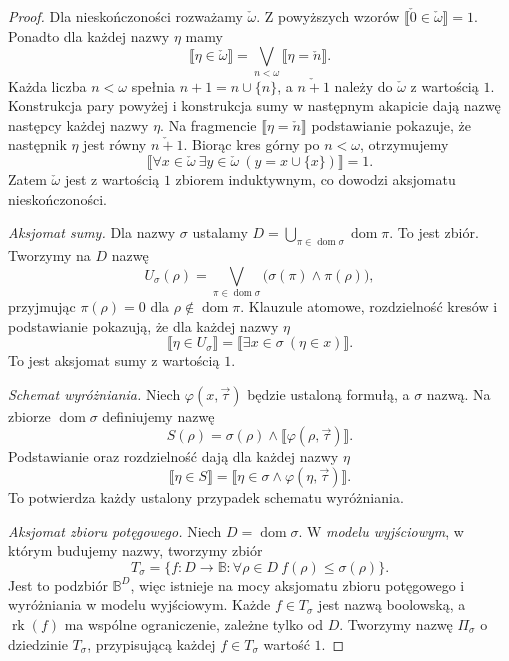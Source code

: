 \begin{proof}
Dla nieskończoności
rozważamy $\check\omega$.
Z powyższych wzorów
$\llbracket\check 0\in
\check\omega\rrbracket=1$.
Ponadto dla każdej nazwy
$\eta$ mamy
\[
 \llbracket\eta\in\check\omega\rrbracket
 =\bigvee_{n<\omega}
     \llbracket\eta=\check n\rrbracket.
\]
Każda liczba $n<\omega$
spełnia $n+1=n\cup\{n\}$,
a $\check{n+1}$ należy
do $\check\omega$ z
wartością $1$. Konstrukcja
pary powyżej i konstrukcja
sumy w następnym akapicie
dają nazwę następcy każdej
nazwy $\eta$. Na fragmencie
$\llbracket\eta=\check n\rrbracket$
podstawianie pokazuje, że
następnik $\eta$ jest równy
$\check{n+1}$. Biorąc kres
górny po $n<\omega$,
otrzymujemy
\[
 \llbracket
  \forall x\in\check\omega\
  \exists y\in\check\omega\
     (y=x\cup\{x\})
 \rrbracket=1.
\]
Zatem $\check\omega$ jest
z wartością $1$ zbiorem
induktywnym, co dowodzi
aksjomatu nieskończoności.

\emph{Aksjomat sumy.}
Dla nazwy $\sigma$ ustalamy
$D=\bigcup_{\pi\in\operatorname{dom}\sigma}
\operatorname{dom}\pi$. To jest zbiór.
Tworzymy na $D$ nazwę
\[
 U_\sigma(\rho)=
 \bigvee_{\pi\in\operatorname{dom}\sigma}
   \bigl(\sigma(\pi)\wedge
     \pi(\rho)\bigr),
\]
przyjmując $\pi(\rho)=0$ dla
$\rho\notin\operatorname{dom}\pi$.
Klauzule atomowe, rozdzielność
kresów i podstawianie pokazują,
że dla każdej nazwy $\eta$
\[
 \llbracket\eta\in U_\sigma\rrbracket
 =\llbracket
    \exists x\in\sigma\ (\eta\in x)\rrbracket.
\]
To jest aksjomat sumy z wartością $1$.

\emph{Schemat wyróżniania.}
Niech $\varphi(x,\vec\tau)$ będzie
ustaloną formułą, a $\sigma$ nazwą.
Na zbiorze $\operatorname{dom}\sigma$
definiujemy nazwę
\[
 S(\rho)=\sigma(\rho)\wedge
      \llbracket\varphi(\rho,\vec\tau)\rrbracket.
\]
Podstawianie oraz rozdzielność
dają dla każdej nazwy $\eta$
\[
 \llbracket\eta\in S\rrbracket
 =\llbracket\eta\in\sigma\land
                  \varphi(\eta,\vec\tau)\rrbracket.
\]
To potwierdza każdy ustalony
przypadek schematu wyróżniania.

\emph{Aksjomat zbioru potęgowego.}
Niech $D=\operatorname{dom}\sigma$.
W \emph{modelu wyjściowym},
w którym budujemy nazwy,
tworzymy zbiór
\[
 T_\sigma=\{f:D\to\mathbb B:
                 \forall\rho\in D\
                 f(\rho)\le\sigma(\rho)\}.
\]
Jest to podzbiór
$\mathbb B^D$, więc istnieje
na mocy aksjomatu zbioru
potęgowego i wyróżniania
w modelu wyjściowym.
Każde $f\in T_\sigma$
jest nazwą boolowską,
a $\operatorname{rk}(f)$
ma wspólne ograniczenie,
zależne tylko od $D$.
Tworzymy nazwę $\Pi_\sigma$
o dziedzinie $T_\sigma$,
przypisującą każdej
$f\in T_\sigma$ wartość $1$.


\end{proof}
